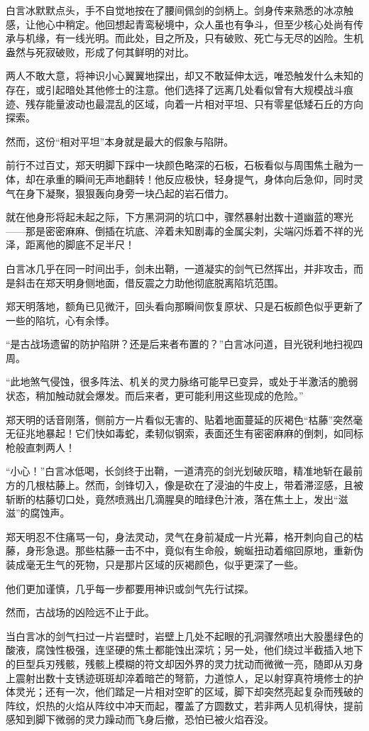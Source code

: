 白言冰默默点头，手不自觉地按在了腰间佩剑的剑柄上。剑身传来熟悉的冰凉触感，让他心中稍定。他回想起青鸾秘境中，众人虽也有争斗，但至少核心处尚有传承与机缘，有一线光明。而此处，目之所及，只有破败、死亡与无尽的凶险。生机盎然与死寂破败，形成了何其鲜明的对比。

两人不敢大意，将神识小心翼翼地探出，却又不敢延伸太远，唯恐触发什么未知的存在，或引起暗处其他修士的注意。他们选择了远离几处看似曾有大规模战斗痕迹、残存能量波动也最混乱的区域，向着一片相对平坦、只有零星低矮石丘的方向探索。

然而，这份“相对平坦”本身就是最大的假象与陷阱。

前行不过百丈，郑天明脚下踩中一块颜色略深的石板，石板看似与周围焦土融为一体，却在承重的瞬间无声地翻转！他反应极快，轻身提气，身体向后急仰，同时灵气在身下凝聚，狠狠轰向身旁一块凸起的岩石借力。

就在他身形将起未起之际，下方黑洞洞的坑口中，骤然暴射出数十道幽蓝的寒光——那是密密麻麻、倒插在坑底、淬着未知剧毒的金属尖刺，尖端闪烁着不祥的光泽，距离他的脚底不足半尺！

白言冰几乎在同一时间出手，剑未出鞘，一道凝实的剑气已然挥出，并非攻击，而是斜击在郑天明身侧地面，借反震之力助他彻底脱离陷坑范围。

郑天明落地，额角已见微汗，回头看向那瞬间恢复原状、只是石板颜色似乎更新了一些的陷坑，心有余悸。

“是古战场遗留的防护陷阱？还是后来者布置的？”白言冰问道，目光锐利地扫视四周。

“此地煞气侵蚀，很多阵法、机关的灵力脉络可能早已变异，或处于半激活的脆弱状态，稍加触动就会爆发。而后来者，更可能利用这些现成的危险。”

郑天明的话音刚落，侧前方一片看似无害的、贴着地面蔓延的灰褐色“枯藤”突然毫无征兆地暴起！它们快如毒蛇，柔韧似钢索，表面还生有密密麻麻的倒刺，如同标枪般直刺两人！

“小心！”白言冰低喝，长剑终于出鞘，一道清亮的剑光划破灰暗，精准地斩在最前方的几根枯藤上。然而，剑锋切入，像是砍在了浸油的牛皮上，带着滞涩感，且被斩断的枯藤切口处，竟然喷溅出几滴腥臭的暗绿色汁液，落在焦土上，发出“滋滋”的腐蚀声。

郑天明忍不住痛骂一句，身法灵动，灵气在身前凝成一片光幕，格开刺向自己的枯藤，身形急退。那些枯藤一击不中，竟似有生命般，蜿蜒扭动着缩回原地，重新伪装成毫无生气的死物，只是那片区域的灰褐颜色，似乎更深了一些。

他们更加谨慎，几乎每一步都要用神识或剑气先行试探。

然而，古战场的凶险远不止于此。

当白言冰的剑气扫过一片岩壁时，岩壁上几处不起眼的孔洞骤然喷出大股墨绿色的酸液，腐蚀性极强，连坚硬的焦土都能蚀出深坑；另一处，他们绕过半截插入地下的巨型兵刃残骸，残骸上模糊的符文却因外界的灵力扰动而微微一亮，随即从刃身上震射出数十支锈迹斑斑却淬着暗芒的弩箭，力道惊人，足以射穿真符境修士的护体灵光；还有一次，他们踏足一片相对空旷的区域，脚下却突然亮起复杂而残破的阵纹，炽热的火焰从阵纹中冲天而起，覆盖了方圆数丈，若非两人见机得快，提前感知到脚下微弱的灵力躁动而飞身后撤，恐怕已被火焰吞没。

